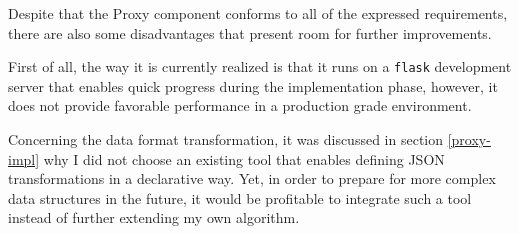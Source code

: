 

Despite that the Proxy component conforms to all of the expressed requirements, there are also some disadvantages that present room for further improvements.

First of all, the way it is currently realized is that it runs on a \texttt{flask} development server that enables quick progress during the implementation phase, however, it does not provide favorable performance in a production grade environment.

Concerning the data format transformation, it was discussed in section \ref{proxy-impl} why I did not choose an existing tool that enables defining JSON transformations in a declarative way. Yet, in order to prepare for more complex data structures in the future, it would be profitable to integrate such a tool instead of further extending my own algorithm.


